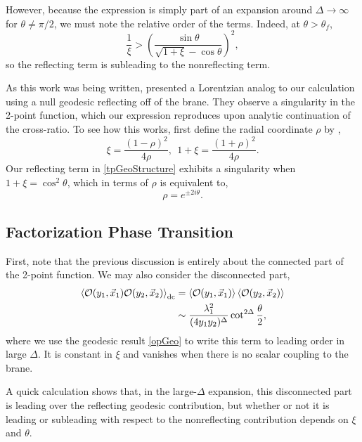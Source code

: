 \documentclass[reprint,amsmath,amssymb,aps,nofootinbib,twocolumn]{revtex4-2}
\begin{document}
However, because the expression is simply part of an expansion around $\Delta \to \infty$ for $\theta \neq \pi/2$, we must note the relative order of the terms. Indeed, at $\theta > \theta_f$,
\begin{equation}
\frac{1}{\xi} > \left(\frac{\sin\theta}{\sqrt{1+\xi} - \cos\theta}\right)^2,
\end{equation}
so the reflecting term is subleading to the nonreflecting term.

As this work was being written, \cite{Reeves:2021sab} presented a Lorentzian analog to our calculation using a null geodesic reflecting off of the brane. They observe a singularity in the 2-point function, which our expression reproduces upon analytic continuation of the cross-ratio. To see how this works, first define the radial coordinate $\rho$ by \cite{Pappadopulo:2012jk,Hogervorst:2013sma},
\begin{equation}
\xi = \frac{(1-\rho)^2}{4\rho},\ \ 1 + \xi = \frac{(1 + \rho)^2}{4\rho}.
\end{equation}
Our reflecting term in \eqref{tpGeoStructure} exhibits a singularity when $1 + \xi = \cos^2\theta$, which in terms of $\rho$ is equivalent to,
\begin{equation}
\rho = e^{\pm 2i\theta}.
\end{equation}

\subsection{Factorization Phase Transition}\label{sec3B}

First, note that the previous discussion is entirely about the connected part of the 2-point function. We may also consider the disconnected part,
\begin{align}
\expval{\mathcal{O}(y_1,\vec{x}_1)\mathcal{O}(y_2,\vec{x}_2)}_{\text{dc}}
&= \expval{\mathcal{O}(y_1,\vec{x}_1)}\expval{\mathcal{O}(y_2,\vec{x}_2)}\nonumber\\
&\sim \frac{\lambda_1^2}{(4y_1 y_2)^\Delta} \cot^{2\Delta}\frac{\theta}{2},
\end{align}
where we use the geodesic result \eqref{opGeo} to write this term to leading order in large $\Delta$. It is constant in $\xi$ and vanishes when there is no scalar coupling to the brane.

A quick calculation shows that, in the large-$\Delta$ expansion, this disconnected part is leading over the reflecting geodesic contribution, but whether or not it is leading or subleading with respect to the nonreflecting contribution depends on $\xi$ and $\theta$. 
\end{document}
